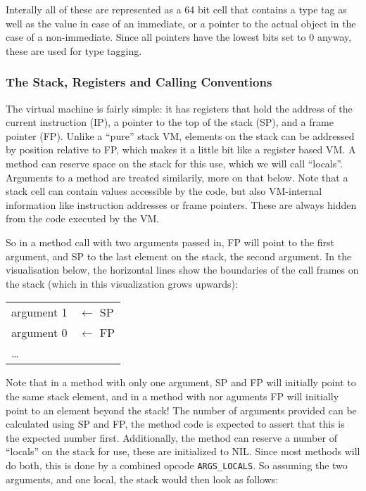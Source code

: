 \documentclass[12pt,a4paper]{article}
\begin{document}
Interally all of these are represented as a 64 bit cell that contains a type tag as well as the value in case of an immediate, or a pointer to the actual object in the case of a non-immediate. Since all pointers have the lowest bits set to 0 anyway, these are used for type tagging.

\subsubsection{The Stack, Registers and Calling Conventions}\label{sec:stack}

The virtual machine is fairly simple: it has registers that hold the address of the current instruction (IP), a pointer to the top of the stack (SP), and a frame pointer (FP). Unlike a ``pure'' stack VM, elements on the stack can be addressed by position relative to FP, which makes it a little bit like a
register based VM. A method can reserve space on the stack for this use, which we will call ``locals''. Arguments to a method are treated similarily, more on that below. Note that a stack cell can contain values accessible by the code, but also VM-internal information like instruction addresses or frame pointers. These are always hidden from the code executed by the VM.

So in a method call with two arguments passed in, FP will point to the first argument, and SP to the last element on the stack, the second argument. In the visualisation below, the horizontal lines show the boundaries of the call frames on the stack (which in this visualization grows upwards):

\begin{table}[H]
\centering
\begin{tabular}{|p{3cm}|p{3cm}}
argument 1 & $\leftarrow$ SP \\
argument 0 & $\leftarrow$ FP \\
\cline{1-1}
\ldots & \\
\end{tabular}
\end{table}

Note that in a method with only one argument, SP and FP will initially point to the same stack element, and in a method with nor aguments FP will initially point to an element beyond the stack! The number of arguments provided can be calculated using SP and FP, the method code is expected to assert that this is the expected number first. Additionally, the method can reserve a number of ``locals'' on the stack for use, these are initialized to NIL. Since most methods will do both, this is done by a combined opcode \verb|ARGS_LOCALS|. So assuming the two arguments, and one local, the stack would then look as follows:
\end{document}
